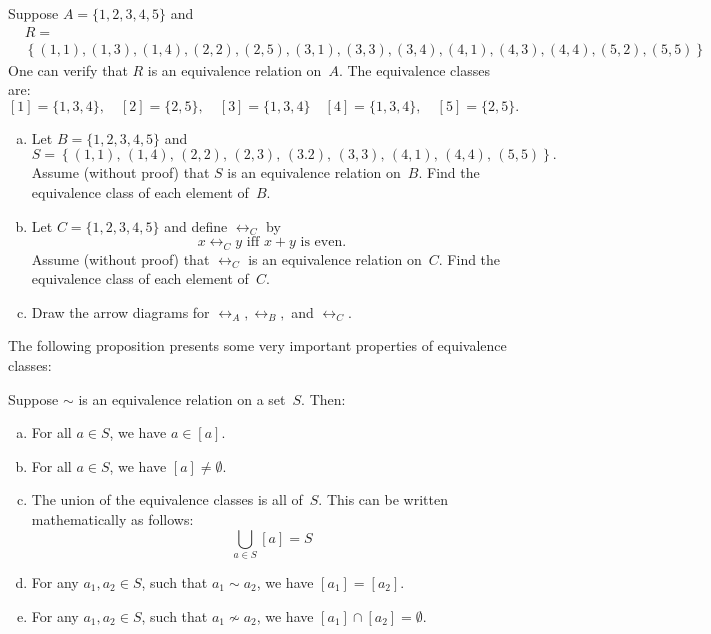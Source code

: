 \begin{eg} \label{EquivClassEg}
Suppose $A = \{1,2,3,4,5\}$ and 
\begin{align*}
&R = \\
&\left\{  (1,1), (1,3), (1,4), (2,2), (2,5), (3,1), (3,3), 
		(3,4), (4,1), (4,3), (4,4), (5,2), (5,5) 
\right\}
\end{align*}
One can verify that $R$ is an equivalence relation on~$A$. The equivalence classes are:
$$ [1] = \{1,3,4\},
\quad [2] = \{2,5\} ,
\quad [3] = \{1,3,4\} 
\quad[4] = \{1,3,4\} ,
\quad [5] = \{2,5\} .$$
\end{eg}


\begin{exercise}\label{exercise:EquivalenceRelationsChap:EquivClassEasyEx}
\begin{enumerate}[(a)]
\item \label{EquivClassEasyEx-set}
Let $B = \{1,2,3,4,5\}$ and 
	$$S = \left\{ (1,1),\, (1,4),\, (2,2),\, (2,3),\, (3.2),\, 
		(3,3),\, (4,1),\, (4,4),\, (5,5)
		 \right\} .$$
Assume (without proof) that $S$ is an equivalence relation on~$B$. Find the equivalence class of each element of~$B$.


\item \label{EquivClassEasyEx-x+y}
Let $C = \{1,2,3,4,5\}$ and define $\rel_C$ by 
	$$ \text{$x \rel_C y$ iff $x + y$ is even.} $$
Assume (without proof) that $\rel_C$ is an equivalence relation on~$C$. Find the equivalence class of each element of~$C$.
\item
Draw the arrow diagrams for $\rel_A, \rel_B,$ and $\rel_C$.
\end{enumerate}
\end{exercise}


The following proposition presents some very important properties of equivalence classes:

\begin{thm} \label{EquivRelProps}
Suppose $\sim$ is an equivalence relation on a set~$S$. Then:
\begin{enumerate}[(a)]
\item \label{EquivRelProps-aIn[a]}
 For all $a \in S$, we have $a \in [a]$.
\item \label{EquivRelProps-nonempty}
 For all $a \in S$, we have $[a] \neq \emptyset$.
\item \label{EquivRelProps-union}
 The union of the equivalence classes is all of~$S$. This can be written mathematically as follows:
	$$ \bigcup_{a \in S} [a] = S$$
\item \label{EquivRelProps-equal}
 For any $a_1,a_2 \in S$, such that $a_1 \sim a_2$, we have $[a_1] = [a_2]$.
\item \label{EquivRelProps-disjoint}
 For any $a_1,a_2 \in S$, such that $a_1 \not\sim a_2$, we have $[a_1] \cap [a_2] = \emptyset$.
\end{enumerate}
\end{thm}

